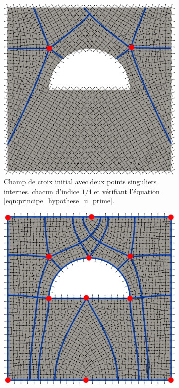 \begin{figure}[!h]
\centering
\begin{subfigure}{0.495\textwidth}
    \includegraphics[width=\textwidth]{images/carre_demi_disc_vide_mauvais_first.pdf}
    \caption{Champ de croix initial avec deux points singuliers internes, chacun d'indice $1/4$ et vérifiant l'équation \ref{eqn:principe_hypothese_u_prime}.}
    \label{fig:carre_demi_disc_vide_mauvais_first}
\end{subfigure}
\hfill
\begin{subfigure}{0.495\textwidth}
    \includegraphics[width=\textwidth]{images/carre_demi_disc_vide_mauvais_second.pdf}

\end{subfigure}
\end{figure}
